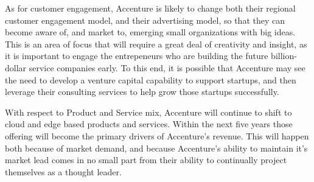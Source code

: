As for customer engagement, Accenture is likely to change both their regional customer engagement model, and their advertising model, so that they can become aware of, and market to, emerging small organizations with big ideas. This is an area of focus that will require a great deal of creativity and insight, as it is important to engage the entrepeneurs who are building the future billion-dollar service companies early. To this end, it is possible that Accenture may see the need to develop a venture capital capability to support startups, and then leverage their consulting services to help grow those startups successfully.

With respect to Product and Service mix, Accenture will continue to shift to cloud and edge based products and services. Within the next five years those offering will become the primary drivers of Accenture's revenue. This will happen both because of market demand, and because Accenture's ability to maintain it's market lead comes in no small part from their ability to continually project themselves as a thought leader.
